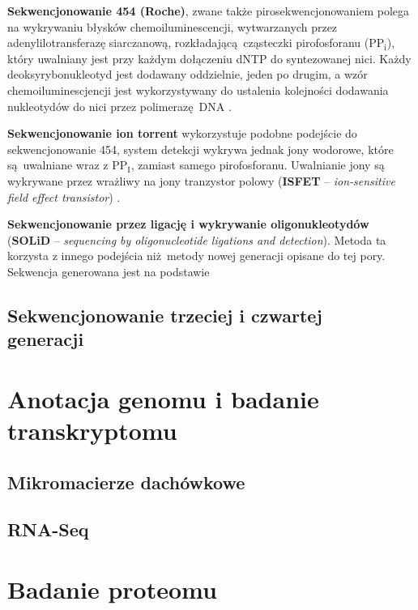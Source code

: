 \documentclass[two column, twoside, a4paper]{article}
\begin{document}
\textbf{Sekwencjonowanie 454 (Roche)}, zwane także pirosekwencjonowaniem polega na wykrywaniu błysków chemoiluminescencji, wytwarzanych przez adenylilotransferazę siarczanową, rozkładającą cząsteczki pirofosforanu ($\mathrm{PP_{i}}$), który uwalniany jest przy każdym dołączeniu dNTP do syntezowanej nici. Każdy deoksyrybonukleotyd jest dodawany oddzielnie, jeden po drugim, a wzór chemoiluminescjencji jest wykorzystywany do ustalenia kolejności dodawania nukleotydów do nici przez polimerazę DNA \autocite{Brown2019} \autocite{Godwin2016}.

\textbf{Sekwencjonowanie ion torrent} wykorzystuje podobne podejście do sekwencjonowanie 454, system detekcji wykrywa jednak jony wodorowe, które są uwalniane wraz z $\mathrm{PP_{I}}$, zamiast samego pirofosforanu. Uwalnianie jony są wykrywane przez wrażliwy na jony tranzystor polowy (\textbf{ISFET} -- \textit{ion-sensitive field effect transistor}) \autocite{Brown2019}.

\textbf{Sekwencjonowanie przez ligację i wykrywanie oligonukleotydów} (\textbf{SOLiD} -- \textit{sequencing by oligonucleotide ligations and detection}). Metoda ta korzysta z innego podejścia niż metody nowej generacji opisane do tej pory. Sekwencja generowana jest na podstawie

\subsection{Sekwencjonowanie trzeciej i czwartej\\ generacji}

\blindtext[3]
\section{Anotacja genomu i badanie transkryptomu}

\blindtext[3]
\subsection{Mikromacierze dachówkowe}

\blindtext[3]
\subsection{RNA-Seq}

\blindtext[3]
\section{Badanie proteomu}
\end{document}
